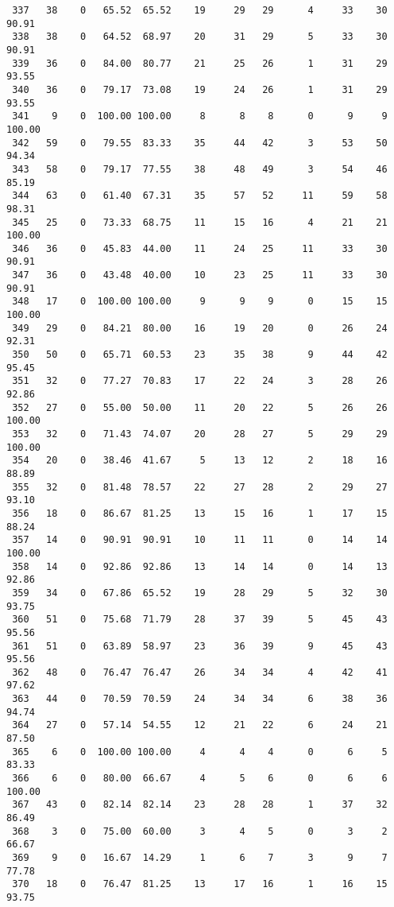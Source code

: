 \begin{verbatim}
 337   38    0   65.52  65.52    19     29   29      4     33    30    90.91
 338   38    0   64.52  68.97    20     31   29      5     33    30    90.91
 339   36    0   84.00  80.77    21     25   26      1     31    29    93.55
 340   36    0   79.17  73.08    19     24   26      1     31    29    93.55
 341    9    0  100.00 100.00     8      8    8      0      9     9   100.00
 342   59    0   79.55  83.33    35     44   42      3     53    50    94.34
 343   58    0   79.17  77.55    38     48   49      3     54    46    85.19
 344   63    0   61.40  67.31    35     57   52     11     59    58    98.31
 345   25    0   73.33  68.75    11     15   16      4     21    21   100.00
 346   36    0   45.83  44.00    11     24   25     11     33    30    90.91
 347   36    0   43.48  40.00    10     23   25     11     33    30    90.91
 348   17    0  100.00 100.00     9      9    9      0     15    15   100.00
 349   29    0   84.21  80.00    16     19   20      0     26    24    92.31
 350   50    0   65.71  60.53    23     35   38      9     44    42    95.45
 351   32    0   77.27  70.83    17     22   24      3     28    26    92.86
 352   27    0   55.00  50.00    11     20   22      5     26    26   100.00
 353   32    0   71.43  74.07    20     28   27      5     29    29   100.00
 354   20    0   38.46  41.67     5     13   12      2     18    16    88.89
 355   32    0   81.48  78.57    22     27   28      2     29    27    93.10
 356   18    0   86.67  81.25    13     15   16      1     17    15    88.24
 357   14    0   90.91  90.91    10     11   11      0     14    14   100.00
 358   14    0   92.86  92.86    13     14   14      0     14    13    92.86
 359   34    0   67.86  65.52    19     28   29      5     32    30    93.75
 360   51    0   75.68  71.79    28     37   39      5     45    43    95.56
 361   51    0   63.89  58.97    23     36   39      9     45    43    95.56
 362   48    0   76.47  76.47    26     34   34      4     42    41    97.62
 363   44    0   70.59  70.59    24     34   34      6     38    36    94.74
 364   27    0   57.14  54.55    12     21   22      6     24    21    87.50
 365    6    0  100.00 100.00     4      4    4      0      6     5    83.33
 366    6    0   80.00  66.67     4      5    6      0      6     6   100.00
 367   43    0   82.14  82.14    23     28   28      1     37    32    86.49
 368    3    0   75.00  60.00     3      4    5      0      3     2    66.67
 369    9    0   16.67  14.29     1      6    7      3      9     7    77.78
 370   18    0   76.47  81.25    13     17   16      1     16    15    93.75

\end{verbatim}
